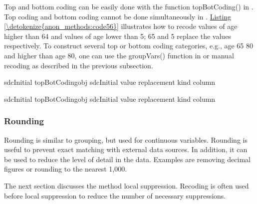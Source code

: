 \documentclass[letterpaper,10pt,english]{sphinxmanual}
\begin{document}
Top and bottom coding can be easily done with the function
topBotCoding() in . Top coding and bottom coding cannot be
done simultaneously in . \hyperref[\detokenize{anon_methods:code56}]{Listing \ref{\detokenize{anon_methods:code56}}} illustrates how to recode
values of age higher than 64 and values of age lower than 5; 65 and 5
replace the values respectively. To construct several top or bottom
coding categories, e.g., age 65 \textendash{} 80 and higher than age 80, one can use
the groupVars() function in  or manual recoding as described
in the previous subsection.

\def\sphinxLiteralBlockLabel{\label{\detokenize{anon_methods:code56}}}
%
\begin{sphinxVerbatim}[commandchars=\\\{\},numbers=left,firstnumber=1,stepnumber=1]
sdcInitial  topBotCodingobj  sdcInitial value   replacement  
                           kind   column  

sdcInitial  topBotCodingobj  sdcInitial value   replacement  
                           kind   column  
\end{sphinxVerbatim}


\subsubsection{Rounding}
\label{\detokenize{anon_methods:rounding}}
Rounding is similar to grouping, but used for continuous variables.
Rounding is useful to prevent exact matching with external data sources.
In addition, it can be used to reduce the level of detail in the data.
Examples are removing decimal figures or rounding to the nearest 1,000.

The next section discusses the method local suppression. Recoding is
often used before local suppression to reduce the number of necessary
suppressions.
\end{document}
